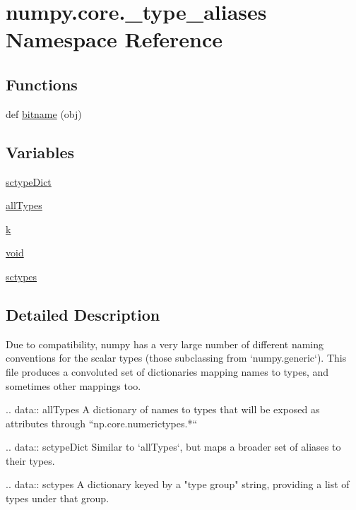\hypertarget{namespacenumpy_1_1core_1_1__type__aliases}{}\section{numpy.\+core.\+\_\+type\+\_\+aliases Namespace Reference}
\label{namespacenumpy_1_1core_1_1__type__aliases}
\subsection*{Functions}
\begin{DoxyCompactItemize}
\item 
def \hyperlink{namespacenumpy_1_1core_1_1__type__aliases_a3964ddaf325eb43b4f7515eab8ec4f13}{bitname} (obj)
\end{DoxyCompactItemize}
\subsection*{Variables}
\begin{DoxyCompactItemize}
\item 
\hyperlink{namespacenumpy_1_1core_1_1__type__aliases_a1cab0f1d8b5cf203e0d69ced58c9a066}{sctype\+Dict}
\item 
\hyperlink{namespacenumpy_1_1core_1_1__type__aliases_a52d71ff2698ca42add0aeb48bcfabc32}{all\+Types}
\item 
\hyperlink{namespacenumpy_1_1core_1_1__type__aliases_ae054468eb5c1add1715dd28baac9b63f}{k}
\item 
\hyperlink{namespacenumpy_1_1core_1_1__type__aliases_a1e74b40204cf44457729b6c698127e02}{void}
\item 
\hyperlink{namespacenumpy_1_1core_1_1__type__aliases_ace31f2d02a857608f0746528fbc47186}{sctypes}
\end{DoxyCompactItemize}


\subsection{Detailed Description}
\begin{DoxyVerb}Due to compatibility, numpy has a very large number of different naming
conventions for the scalar types (those subclassing from `numpy.generic`).
This file produces a convoluted set of dictionaries mapping names to types,
and sometimes other mappings too.

.. data:: allTypes
A dictionary of names to types that will be exposed as attributes through
``np.core.numerictypes.*``

.. data:: sctypeDict
Similar to `allTypes`, but maps a broader set of aliases to their types.

.. data:: sctypes
A dictionary keyed by a "type group" string, providing a list of types
under that group.\end{DoxyVerb}
 

